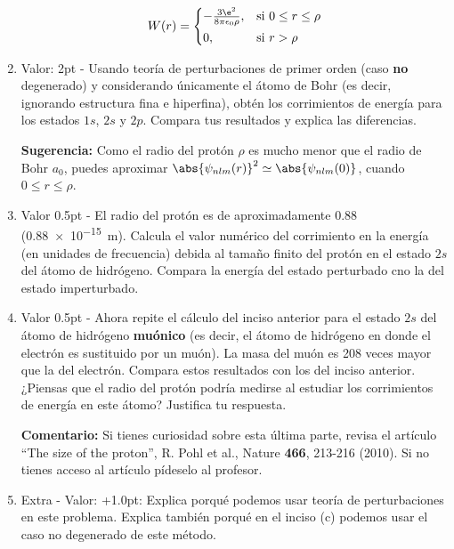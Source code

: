 \documentclass[./../main.tex]{subfiles}
\begin{document}
\begin{exercise}
\begin{enumerate}
            \begin{equation*}
                W(r) = 
                \begin{cases*}
                    -\tfrac{3\e^{2}}{8\pi\epsilon_{0}\rho}, & si \(0 \leq r \leq \rho\)\\
                    0, & si \(r > \rho\)
                \end{cases*}
            \end{equation*}

            \item Valor: 2pt - Usando teoría de perturbaciones de primer orden (caso \textbf{no} degenerado) y considerando únicamente el átomo de Bohr (es decir, ignorando estructura fina e hiperfina), obtén los corrimientos de energía para los estados \(1s\), \(2s\) y \(2p\). Compara tus resultados y explica las diferencias.
            
            \textbf{Sugerencia:} Como el radio del protón \(\rho\) es mucho menor que el radio de Bohr \(a_{0}\), puedes aproximar \(\abs{\psi_{nlm}(r)}^{2} \simeq \abs{\psi_{nlm}(0)}\), cuando \(0 \leq r \leq \rho\).
            
            \item Valor 0.5pt - El radio del protón es de aproximadamente \qty{0.88}{\fm} (\qty{0.88e-15}{\m}). Calcula el valor numérico del corrimiento en la energía (en unidades de frecuencia) debida al tamaño finito del protón en el estado \(2s\) del átomo de hidrógeno. Compara la energía del estado perturbado cno la del estado imperturbado.
            
            \item Valor 0.5pt - Ahora repite el cálculo del inciso anterior para el estado \(2s\) del átomo de hidrógeno \textbf{muónico} (es decir, el átomo de hidrógeno en donde el electrón es sustituido por un muón). La masa del muón es 208 veces mayor que la del electrón. Compara estos resultados con los del inciso anterior. ¿Piensas que el radio del protón podría medirse al estudiar los corrimientos de energía en este átomo? Justifica tu respuesta.
            
            \textbf{Comentario:} Si tienes curiosidad sobre esta última parte, revisa el artículo ``The size of the proton'', R. Pohl et al., Nature \textbf{466}, 213-216 (2010). Si no tienes acceso al artículo pídeselo al profesor.
            
            \color{blue}
            \item Extra - Valor: +1.0pt: Explica porqué podemos usar teoría de perturbaciones en este problema. Explica también porqué en el inciso (c) podemos usar el caso no degenerado de este método.
        \end{enumerate}
    \end{exercise}
\end{document}
